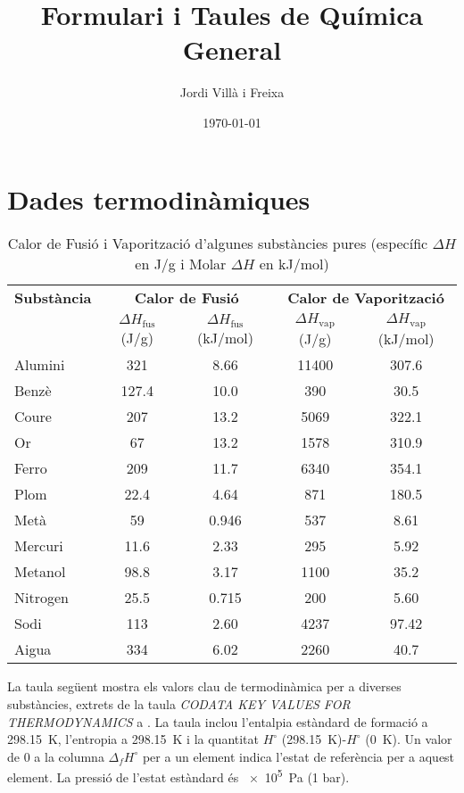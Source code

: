 \documentclass{article}
\title{Formulari i Taules de Química General}
\author{Jordi Villà i Freixa}
\date{\today}
\begin{document}
\maketitle
\tableofcontents

\newpage
\section{Dades termodinàmiques}
\begin{longtable}{lcccc}
    \caption{Calor de Fusió i Vaporització d'algunes substàncies pures (específic $\Delta H$ en J/g i Molar $\Delta H$ en kJ/mol)}\\
    \toprule
    \textbf{Substància} & \multicolumn{2}{c}{\textbf{Calor de Fusió}} & \multicolumn{2}{c}{\textbf{Calor de Vaporització}} \\
    & $\Delta H_\text{fus}$ (J/g) & $\Delta H_\text{fus}$ (kJ/mol) & $\Delta H_\text{vap}$ (J/g) & $\Delta H_\text{vap}$ (kJ/mol) \\
    \midrule\endhead
    Alumini & 321 & 8.66 & 11400 & 307.6 \\
    Benzè & 127.4 & 10.0 & 390 & 30.5 \\
    Coure & 207 & 13.2 & 5069 & 322.1 \\
    Or & 67 & 13.2 & 1578 & 310.9 \\
    Ferro & 209 & 11.7 & 6340 & 354.1 \\
    Plom & 22.4 & 4.64 & 871 & 180.5 \\
    Metà & 59 & 0.946 & 537 & 8.61 \\
    Mercuri & 11.6 & 2.33 & 295 & 5.92 \\
    Metanol & 98.8 & 3.17 & 1100 & 35.2 \\
    Nitrogen & 25.5 & 0.715 & 200 & 5.60 \\
    Sodi & 113 & 2.60 & 4237 & 97.42 \\
    Aigua & 334 & 6.02 & 2260 & 40.7 \\
    \bottomrule
\end{longtable}

La taula següent mostra els valors clau de termodinàmica per a diverses substàncies, extrets de la taula \emph{CODATA KEY VALUES FOR THERMODYNAMICS} a \cite{cox_codata_1989,lide_crc_2005}.
La taula inclou l'entalpia estàndard de formació a \qty{298.15}{\kelvin}, l'entropia a \qty{298.15}{\kelvin} i la quantitat \(H^\circ\) (\qty{298.15}{\kelvin})-\(H^\circ\) (\qty{0}{\kelvin}). Un valor de 0 a la columna \(\Delta_f H^\circ\) per a un element indica l'estat de referència per a aquest element. La pressió de l'estat estàndard és \qty{e5}{\pascal} (1 bar).
\end{document}
